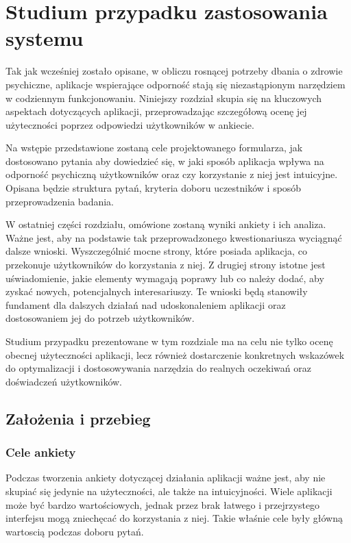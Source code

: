 \chapter{Studium przypadku zastosowania systemu}
Tak jak wcześniej zostało opisane, w obliczu rosnącej potrzeby dbania o zdrowie
psychiczne, aplikacje wspierające odporność stają się niezastąpionym narzędziem
w codziennym funkcjonowaniu. Niniejszy rozdział skupia się na kluczowych
aspektach dotyczących aplikacji, przeprowadzając szczegółową ocenę jej
użyteczności poprzez odpowiedzi użytkowników w ankiecie. 

Na wstępie przedstawione zostaną cele projektowanego formularza, jak dostosowano
pytania aby dowiedzieć się, w jaki sposób aplikacja wpływa na odporność
psychiczną użytkowników oraz czy korzystanie z niej jest intuicyjne. Opisana
będzie struktura pytań, kryteria doboru uczestników i sposób przeprowadzenia
badania.

W ostatniej części rozdziału, omówione zostaną wyniki ankiety i ich analiza.
Ważne jest, aby na podstawie tak przeprowadzonego kwestionariusza wyciągnąć
dalsze wnioski. Wyszczególnić mocne strony, które posiada aplikacja, co
przekonuje użytkowników do korzystania z niej. Z drugiej strony istotne jest
uświadomienie, jakie elementy wymagają poprawy lub co należy dodać, aby zyskać
nowych, potencjalnych interesariuszy. Te wnioski będą stanowiły fundament dla
dalszych działań nad udoskonaleniem aplikacji oraz dostosowaniem jej do potrzeb
użytkowników.

Studium przypadku prezentowane w tym rozdziale ma na celu nie tylko ocenę
obecnej użyteczności aplikacji, lecz również dostarczenie konkretnych wskazówek
do optymalizacji i dostosowywania narzędzia do realnych oczekiwań oraz
doświadczeń użytkowników.

\section{Założenia i przebieg}
\subsection{Cele ankiety}
Podczas tworzenia ankiety dotyczącej działania aplikacji ważne jest, aby nie
skupiać się jedynie na użyteczności, ale także na intuicyjności. Wiele aplikacji
może być bardzo wartościowych, jednak przez brak łatwego i przejrzystego
interfejsu mogą zniechęcać do korzystania z niej. Takie właśnie cele były główną
wartoscią podczas doboru pytań. 

